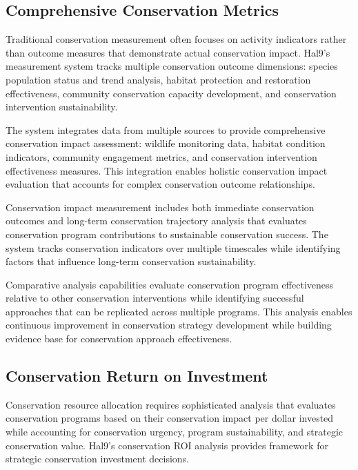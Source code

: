 \documentclass[
  Letterpaper,
]{scrbook}
\begin{document}
\subsection{Comprehensive Conservation
Metrics}\label{comprehensive-conservation-metrics}

Traditional conservation measurement often focuses on activity
indicators rather than outcome measures that demonstrate actual
conservation impact. Hal9's measurement system tracks multiple
conservation outcome dimensions: species population status and trend
analysis, habitat protection and restoration effectiveness, community
conservation capacity development, and conservation intervention
sustainability.

The system integrates data from multiple sources to provide
comprehensive conservation impact assessment: wildlife monitoring data,
habitat condition indicators, community engagement metrics, and
conservation intervention effectiveness measures. This integration
enables holistic conservation impact evaluation that accounts for
complex conservation outcome relationships.

Conservation impact measurement includes both immediate conservation
outcomes and long-term conservation trajectory analysis that evaluates
conservation program contributions to sustainable conservation success.
The system tracks conservation indicators over multiple timescales while
identifying factors that influence long-term conservation
sustainability.

Comparative analysis capabilities evaluate conservation program
effectiveness relative to other conservation interventions while
identifying successful approaches that can be replicated across multiple
programs. This analysis enables continuous improvement in conservation
strategy development while building evidence base for conservation
approach effectiveness.

\subsection{Conservation Return on
Investment}\label{conservation-return-on-investment}

Conservation resource allocation requires sophisticated analysis that
evaluates conservation programs based on their conservation impact per
dollar invested while accounting for conservation urgency, program
sustainability, and strategic conservation value. Hal9's conservation
ROI analysis provides framework for strategic conservation investment
decisions.
\end{document}

